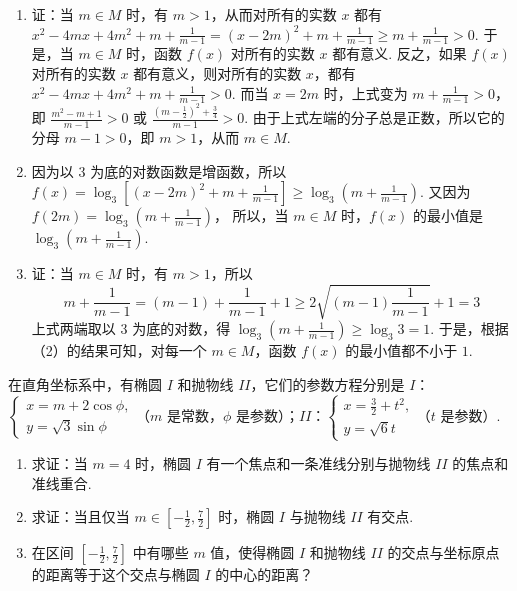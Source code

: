 \documentclass[UTF8,a4paper,oneside,11pt]{ctexbook}
\begin{document}
\begin{solution}
\begin{enumerate}
\item 证：当 \(m \in M\) 时，有 \(m > 1\)，从而对所有的实数 \(x\) 都有
\(x^{2}-4mx+4m^{2}+m+\frac{1}{m-1}=(x-2m)^{2}+m+\frac{1}{m-1}\geqslant m+\frac{1}{m-1}>0\).
于是，当 \(m \in M\) 时，函数 \(f(x)\) 对所有的实数 \(x\) 都有意义.
反之，如果 \(f(x)\) 对所有的实数 \(x\) 都有意义，则对所有的实数 \(x\)，都有
\(x^{2}-4mx+4m^{2}+m+\frac{1}{m-1}>0\).
而当 \(x=2m\) 时，上式变为
\(m+\frac{1}{m-1}>0\)，
即
\(\frac{m^{2}-m+1}{m-1}>0\)
或
\(\frac{\left(m-\frac{1}{2}\right)^{2}+\frac{3}{4}}{m-1}>0\).
由于上式左端的分子总是正数，所以它的分母 \(m-1>0\)，即 \(m>1\)，从而 \(m\in M\).

\item 因为以 \(3\) 为底的对数函数是增函数，所以
\(f(x)=\log_{3}\left[(x-2m)^{2}+m+\frac{1}{m-1}\right]\geqslant\log_{3}\left(m+\frac{1}{m-1}\right)\).
又因为
\(f(2m)=\log_{3}\left(m+\frac{1}{m-1}\right)\)，
所以，当 \(m \in M\) 时，\(f(x)\) 的最小值是
\(\log_{3}\left(m+\frac{1}{m-1}\right)\).

\item 证：当 \(m \in M\) 时，有 \(m > 1\)，所以
\[
m+\frac{1}{m-1}=(m-1)+\frac{1}{m-1}+1\geqslant2\sqrt{(m-1)\frac{1}{m-1}}+1=3
\]
上式两端取以 \(3\) 为底的对数，得
\(\log_{3}\left(m+\frac{1}{m-1}\right)\geqslant\log_{3}3=1\).
于是，根据（2）的结果可知，对每一个 \(m \in M\)，函数 \(f(x)\) 的最小值都不小于 \(1\).
\end{enumerate}
\end{solution}

\begin{problem}

在直角坐标系中，有椭圆 \(I\) 和抛物线 \(II\)，它们的参数方程分别是 \(I\)：\(\begin{cases}
x = m + 2\cos\phi,\\
y = \sqrt{3}\sin\phi
\end{cases}\)（\(m\) 是常数，\(\phi\) 是参数）；\(II\)：\(\begin{cases}
x = \frac{3}{2}+t^{2},\\
y = \sqrt{6}t
\end{cases}\)（\(t\) 是参数）.

\begin{enumerate}
\item 求证：当 \(m=4\) 时，椭圆 \(I\) 有一个焦点和一条准线分别与抛物线 \(II\) 的焦点和准线重合.
\item 求证：当且仅当 \(m \in [-\frac{1}{2}, \frac{7}{2}]\) 时，椭圆 \(I\) 与抛物线 \(II\) 有交点.
\item 在区间 \([-\frac{1}{2}, \frac{7}{2}]\) 中有哪些 \(m\) 值，使得椭圆 \(I\) 和抛物线 \(II\) 的交点与坐标原点的距离等于这个交点与椭圆 \(I\) 的中心的距离？
\end{enumerate}
\end{problem}
\end{document}
